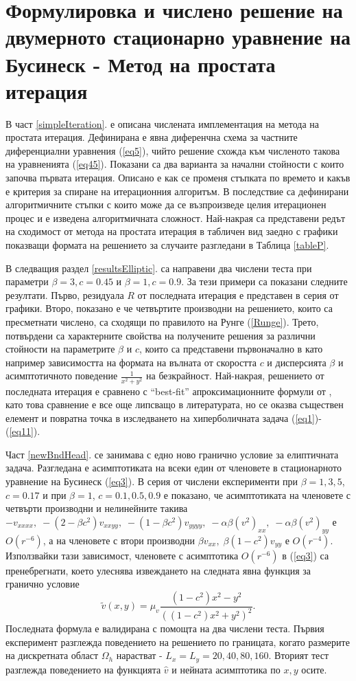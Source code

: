 \documentclass[a4paper]{article}
\newcommand{\be}{\begin{equation}}
\newcommand{\ee}{\end{equation}}
\newcommand{\rf}[1]{(\ref{#1})}
\theoremstyle{remark}
\begin{document}
\section{Формулировка и числено решение на двумерното стационарно уравнение на Бусинеск - Метод на простата итерация}\label{ellipticFormulation}
В част \ref{simpleIteration}. е описана числената имплементация на метода на простата итерация. Дефинирана е явна диференчна схема за частните диференциални уравнения \rf{eq5}, чийто решение схожда към численото такова на уравненията \rf{eq45}. Показани са два варианта за начални стойности с които започва първата итерация. Описано е как се променя стъпката по времето и какъв е критерия за спиране на итерационния алгоритъм. В последствие са дефинирани алгоритмичните стъпки с които може да се възпроизведе целия итерационен процес и е изведена алгоритмичната сложност. Най-накрая са представени редът на сходимост от метода на простата итерация в табличен вид заедно с графики показващи формата на решението за случаите разгледани в Таблица \ref{tableP}. 

В следващия раздел \ref{resultsElliptic}. са направени два числени теста при параметри $\beta = 3, c=0.45$ и $\beta = 1, c=0.9$. За тези примери са показани следните резултати. Първо, резидуала $R$ от последната итерация е представен в серия от графики. Второ, показано е че четвъртите производни на решението, които са пресметнати числено, са сходящи по правилото на Рунге \rf{Runge}. Трето,  потвърдени са характерните свойства на получените решения за различни стойности на параметрите $\beta$ и $c$, които са представени първоначално в \cite{ref116,Ch2011} като например зависимостта на формата на вълната от скоростта $c$ и дисперсията $\beta$ и асимптотичното поведение $\frac{1}{x^2 + y^2}$ на безкрайност. Най-накрая, решението от последната итерация е сравнено с ``best-fit'' апроксимационните формули от \cite{Ch2011}, като това сравнение е все още липсващо в литературата, но се оказва съществен елемент и повратна точка в изследването на хиперболичната задача \rf{eq1}-\rf{eq11}. 

Част \ref{newBndHead}. се занимава с едно ново гранично условие за елиптичната задача. Разгледана е асимптотиката на всеки един от членовете в стационарното уравнение на Бусинеск \rf{eq3}. В серия от числени експерименти при $\beta=1,3,5$, $c=0.17$ и при $\beta=1$, $c=0.1, 0.5, 0.9$ е показано, че асимптотиката на членовете с четвърти производни и нелинейните такива $- v_{xxxx}, \;  - (2-\beta c^2)v_{xxyy},  \;  - (1-\beta c^2)v_{yyyy}, \;  - \alpha \beta (v^2)_{xx}, \; - \alpha \beta (v^2)_{yy}$ е $O(r^{-6})$, а на членовете с втори производни $\beta v_{xx}, \; \beta (1-c^2) v_{yy}$ е $O(r^{-4})$. Използвайки тази зависимост, членовете с асимптотика $O(r^{-6})$ в \rf{eq3} са пренебрегнати, което улеснява извеждането на следната явна функция за гранично условие
\be
\tilde v(x, y) = \mu_v \frac{ (1-c^2) x^2 - y^2 }{ ((1-c^2) x^2 + y^2)^2 }.
\ee
Последната формула е валидирана с помощта на два числени теста. Първия експеримент разглежда поведението на решението по границата, когато размерите на дискретната област $\Omega_h$ нарастват - $L_x = L_y = 20, 40, 80, 160$. Вторият тест разглежда поведението на функцията $\widehat v$ и нейната асимптотика по $x,y$ осите.
\end{document}
